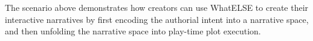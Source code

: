 The scenario above demonstrates how creators can use WhatELSE to create their interactive narratives by first encoding the authorial intent into a narrative space, and then unfolding the narrative space into play-time plot execution. 


















